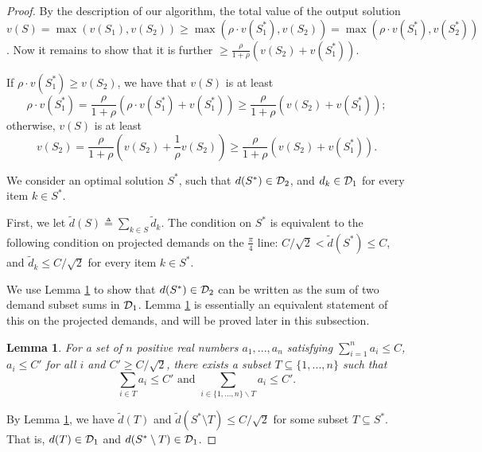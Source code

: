 \documentclass{aamas2013}
\newtheorem{lemma}[theorem]{Lemma}
\begin{document}
\begin{proof}
By the description of our algorithm, the total value of the output solution $v(S)=\max(v({S_1}), v({S_2}))\geq \max(\rho\cdot v({S_1^*}), v({S_2}))= \max(\rho\cdot v({S_1^*}), v({S_2^*}))$.  Now it remains to show that it is further $\geq \frac{\rho}{1+\rho}(v({S_2})+v({S_1^*}))$.

If $\rho\cdot v({S_1^*})\geq v({S_2})$, we have that $v(S)$ is at least 
\begin{equation*}
\rho\cdot v({S_1^*})= \frac{\rho}{1+\rho}(\rho\cdot v({S_1^*})+v({S_1^*}))
\geq \frac{\rho}{1+\rho}( v({S_2})+v({S_1^*}));
\end{equation*}
otherwise, $v(S)$ is at least  
\begin{equation*}
v({S_2})= \frac{\rho}{1+\rho}(v({S_2})+\frac{1}{\rho}v({S_2}))\geq \frac{\rho}{1+\rho}( v({S_2})+v({S_1^*})).
\end{equation*}




 We consider an optimal solution $S^\ast$, such that $d({S^\ast})\in {\cal D}_2$, and $d_k\in {\cal D}_1$ for every item $k\in S^\ast$.

First, we let $\tilde{d}(S) \triangleq \sum_{k\in S} \tilde{d}_k$.  The condition on $S^{\ast}$ is equivalent to the following condition on 
projected demands on the $\frac{\pi}{4}$ line: $C/\sqrt{2}<\tilde{d}({S^\ast}) \leq C$, and $\tilde{d}_k \le  C/\sqrt{2}$ for every item $k\in S^\ast$.

We use Lemma \ref{lem:subsetsumA} to show that $d({S^\ast})\in {\cal D}_2$ can be written as the sum of two demand subset sums in ${\cal D}_1$.  Lemma \ref{lem:subsetsumA} is essentially an equivalent statement of this on the projected demands, and will be proved later in this subsection.     

\begin{lemma} \label{lem:subsetsumA}
For a set of $n$ positive real numbers $a_1, ..., a_n$ satisfying $\sum_{i = 1}^n a_i \le C$,  $a_i \le C'$ for all $i$ and $C'\ge C/\sqrt{2}$, there exists a subset $T \subseteq \{1,...,n\}$ such that
\begin{equation*}
\sum_{i \in T} a_i \le C' \mbox{\ \ and \ \ } \sum_{i \in \{1,...,n\} \backslash T} a_i \le C'.
\end{equation*}
\end{lemma}

By Lemma \ref{lem:subsetsumA}, we have $\tilde{d}(T)$ and $\tilde{d}({S^{\ast}\setminus T}) \le  C/\sqrt{2}$ for some subset $T \subseteq S^\ast$. That is, $d(T)  \in {\cal D}_1$ and $d({S^\ast\setminus T}) \in {\cal D}_1$.


\end{proof}
\end{document}
